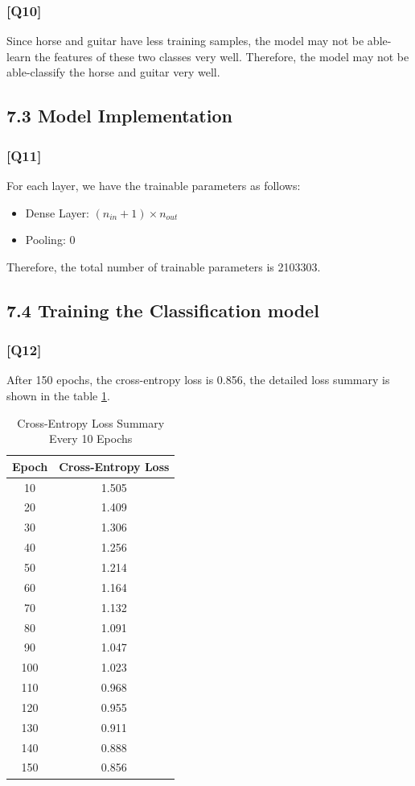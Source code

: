 \documentclass{article}
\begin{document}
\subsubsection*{[Q10]}
Since horse and guitar have less training samples, the model may not be able-learn the features of these two classes very well.
Therefore, the model may not be able-classify the horse and guitar very well.

\subsection*{7.3 Model Implementation}

\subsubsection*{[Q11]}

For each layer, we have the trainable parameters as follows:
\begin{itemize}
    \item Dense Layer: $(n_{in} + 1) \times n_{out}$
    \item Pooling: 0
\end{itemize}

Therefore, the total number of trainable parameters is 2103303.


\subsection*{7.4 Training the Classification model}

\subsubsection*{[Q12]}

After 150 epochs, the cross-entropy loss is 0.856, the detailed loss summary is shown in the table \ref{tab:cross_entropy_loss}.
\begin{table}[ht]
    \centering
    \caption{Cross-Entropy Loss Summary Every 10 Epochs}
    \begin{tabular}{cc}
    \toprule
    Epoch & Cross-Entropy Loss \\
    \midrule
    10  & 1.505 \\
    20  & 1.409 \\
    30  & 1.306 \\
    40  & 1.256 \\
    50  & 1.214 \\
    60  & 1.164 \\
    70  & 1.132 \\
    80  & 1.091 \\
    90  & 1.047 \\
    100 & 1.023 \\
    110 & 0.968 \\
    120 & 0.955 \\
    130 & 0.911 \\
    140 & 0.888 \\
    150 & 0.856 \\
    \bottomrule
    \end{tabular}
    \label{tab:cross_entropy_loss}
\end{table}
\end{document}

